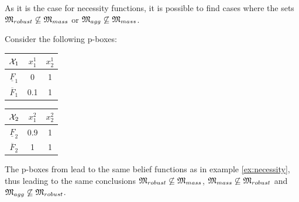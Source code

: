 As it is the case for necessity functions, it is possible to find cases where the sets $\mathfrak{M}_{robust}\not\subseteq \mathfrak{M}_{mass}$ or $\mathfrak{M}_{agg}\not\subseteq\mathfrak{M}_{mass}$.
\begin{example}\label{ex:pbox}
    Consider the following p-boxes:
    \begin{center}
    \begin{tabular}{|c|c|c|}
        \hline
        $\mathcal{X}_1$ & $x^1_1$ & $x^1_2$\\
        \hline\hline
        $\underline{F}_1$ & 0 & 1\\
        \hline
        $\overline{F}_1$ & 0.1 & 1\\
        \hline
    \end{tabular}
    \qquad
    \begin{tabular}{|c|c|c|}
        \hline
        $\mathcal{X}_2$ & $x^2_1$ & $x^2_2$\\
        \hline\hline
        $\underline{F}_2$ & 0.9 & 1\\
        \hline
        $\overline{F}_2$ & 1 & 1\\
        \hline
    \end{tabular}
    \label{tab:example_pbox}
    \end{center}
    The p-boxes from  lead to the same belief functions as in example \ref{ex:necessity}, thus leading to the same conclusions \ie $\mathfrak{M}_{robust}\not\subseteq\mathfrak{M}_{mass}$, $\mathfrak{M}_{mass}\not\subseteq\mathfrak{M}_{robust}$ and $\mathfrak{M}_{agg}\not\subseteq\mathfrak{M}_{robust}$. 
\end{example}


